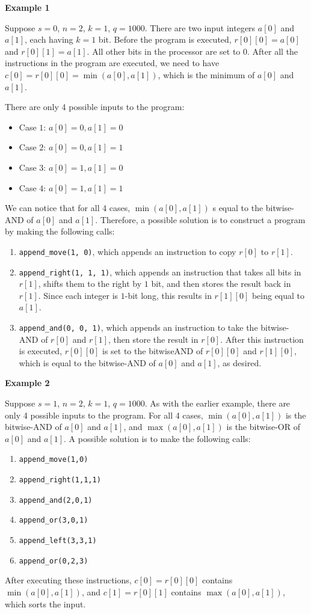 \textbf{Example 1}

Suppose $s = 0$, $n = 2$, $k = 1$, $q = 1000$. There are two input integers $a[0]$ and $a[1]$, each
having $k=1$ bit. Before the program is executed, $r[0][0] = a[0]$ and $r[0][1] = a[1]$. All other bits
in the processor are set to $0$. After all the instructions in the program are executed, we need to have $c[0]=r[0][0] = \min(a[0], a[1])$, which is the minimum of $a[0]$ and $a[1]$.

There are only 4 possible inputs to the program:
\begin{itemize}
\item Case $1$: $a[0]=0, a[1]=0$
\item Case $2$: $a[0]=0, a[1]=1$
\item Case $3$: $a[0]=1, a[1]=0$
\item Case $4$: $a[0]=1, a[1]=1$
\end{itemize}

We can notice that for all 4 cases, $\min(a[0], a[1])$ s equal to the bitwise-AND of $a[0]$ and $a[1]$. Therefore, a possible solution is to construct a program by making the following calls:
\begin{enumerate}
\item \texttt{append\_move(1, 0)},  which appends an instruction to copy $r[0]$ to $r[1]$.
\item \texttt{append\_right(1, 1, 1)}, which appends an instruction that takes all bits in $r[1]$, shifts them
to the right by $1$ bit, and then stores the result back in $r[1]$. Since each integer is $1$-bit long,
this results in $r[1][0]$ being equal to $a[1]$.
\item \texttt{append\_and(0, 0, 1)}, which appends an instruction to take the bitwise-AND of $r[0]$ and $r[1]$, then store the result in $r[0]$. After this instruction is executed, $r[0][0]$ is set to the bitwiseAND of $r[0][0]$ and $r[1][0]$, which is equal to the bitwise-AND of $a[0]$ and $a[1]$, as desired.
\end{enumerate}


\textbf{Example 2}

Suppose $s=1$, $n=2$, $k=1$, $q=1000$. As with the earlier example, there are only 4 possible
inputs to the program. For all 4 cases, $\min(a[0], a[1])$ is the bitwise-AND of $a[0]$ and $a[1]$, and $\max(a[0], a[1])$ is the bitwise-OR of $a[0]$ and $a[1]$. A possible solution is to make the following calls:
\begin{enumerate}
\item \texttt{append\_move(1,0)}
\item \texttt{append\_right(1,1,1)}
\item \texttt{append\_and(2,0,1)}
\item \texttt{append\_or(3,0,1)}
\item \texttt{append\_left(3,3,1)}
\item \texttt{append\_or(0,2,3)}
\end{enumerate}

After executing these instructions, $c[0]=r[0][0]$ contains $\min(a[0],a[1])$, and $c[1]=r[0][1]$ contains $\max(a[0],a[1])$, which sorts the input.